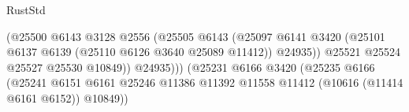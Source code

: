 \begin{lexlean}{RustStd}
\begin{coremodule}
                                                          (@25500
                                                            @6143
                                                            @3128
                                                            @2556
                                                            (@25505
                                                              @6143
                                                              (@25097
                                                                @6141
                                                                @3420
                                                                (@25101
                                                                  @6137
                                                                  @6139
                                                                  (@25110
                                                                    @6126
                                                                    @3640
                                                                    @25089
                                                                    @11412))
                                                                @24935))
                                                            @25521
                                                            @25524
                                                            @25527
                                                            @25530
                                                            @10849))
                                                        @24935)))
                                                  (@25231
                                                    @6166
                                                    @3420
                                                    (@25235
                                                      @6166
                                                      (@25241
                                                        @6151
                                                        @6161
                                                        @25246
                                                        @11386
                                                        @11392
                                                        @11558
                                                        @11412
                                                        (@10616 (@11414 @6161 @6152))
                                                        @10849))

\end{coremodule}
\end{lexlean}

